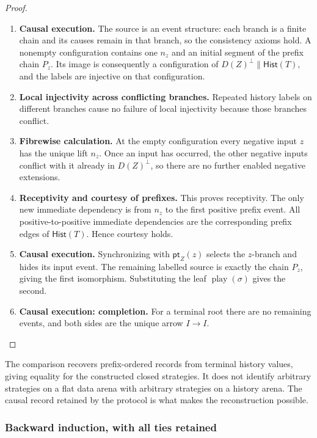 \documentclass[11pt,a4paper]{article}
\numberwithin{equation}{section}
\theoremstyle{definition}
\theoremstyle{remark}
\theoremstyle{plain}
\begin{document}
\begin{proof}
\leavevmode
\begin{enumerate}[label=\textup{(\arabic*)},leftmargin=*,itemsep=4pt,topsep=3pt]
  \item \textbf{Causal execution.} The source is an event structure: each branch is a finite chain and its
causes remain in that branch, so the consistency axioms hold. A nonempty configuration contains one $n_z$ and an initial segment of
the prefix chain $P_z$. Its image is consequently a configuration of
$D(Z)^\perp\parallel\mathsf{Hist}(T)$, and the labels are injective on
that configuration.
  \item \textbf{Local injectivity across conflicting branches.} Repeated history labels on different branches cause
no failure of local injectivity because those branches conflict.
  \item \textbf{Fibrewise calculation.} At the empty configuration every negative input $z$ has the unique lift
$n_z$. Once an input has occurred, the other negative inputs conflict
with it already in $D(Z)^\perp$, so there are no further enabled negative
extensions.
  \item \textbf{Receptivity and courtesy of prefixes.} This proves receptivity. The only new immediate dependency
is from $n_z$ to the first positive prefix event. All positive-to-positive
immediate dependencies are the corresponding prefix edges of
$\mathsf{Hist}(T)$. Hence courtesy holds.
  \item \textbf{Causal execution.} Synchronizing with $\mathsf{pt}_Z(z)$ selects the $z$-branch and
hides its input event. The remaining labelled source is exactly the
chain $P_z$, giving the first isomorphism. Substituting the leaf
$\operatorname{play}(\sigma)$ gives the second.
  \item \textbf{Causal execution: completion.} For a terminal root there
are no remaining events, and both sides are the unique arrow $I\to I$.
\end{enumerate}
\end{proof}


The comparison recovers prefix-ordered records from terminal
history values, giving equality for the constructed closed strategies.
It does not identify arbitrary strategies on a flat data arena with
arbitrary strategies on a history arena. The causal record retained by
the protocol is what makes the reconstruction possible.

\subsubsection{Backward induction, with all ties retained}
\end{document}
